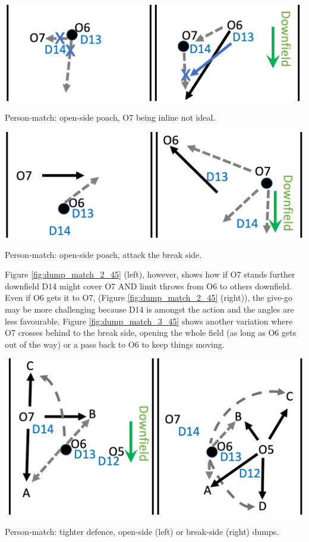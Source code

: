 \documentclass{tufte-handout}
\begin{document}
\begin{marginfigure}%
  \includegraphics[width=\linewidth]{dump_match_2_45}
 \caption{Person-match: open-side poach, O7 being inline not ideal.}
 \label{fig:dump_match_2_45}
 \end{marginfigure}
 \begin{marginfigure}%
  \includegraphics[width=\linewidth]{dump_match_3_45}
 \caption{Person-match: open-side poach, attack the break side.}
 \label{fig:dump_match_3_45}
 \end{marginfigure}
Figure \ref{fig:dump_match_2_45} (left), however, 
shows how if O7 stands further downfield 
D14 might cover O7 AND 
limit throws from O6 to others downfield. 
Even if O6 gets it to O7, 
(Figure \ref{fig:dump_match_2_45} (right)), 
the give-go may be more challenging because 
D14 is amongst the action 
and the angles are less favourable. 
Figure \ref{fig:dump_match_3_45} shows 
another variation 
where O7 crosses behind 
to the break side, 
opening the whole field 
(as long as O6 gets out of the way) 
 or a pass back to O6 to 
 keep things moving. 

\begin{marginfigure}%
  \includegraphics[width=\linewidth]{dump_match_4_tight}
 \caption{Person-match: tighter defence, open-side (left) or break-side (right) dumps.}
 \label{fig:dump_match_4_tight}
 \end{marginfigure}
\end{document}
